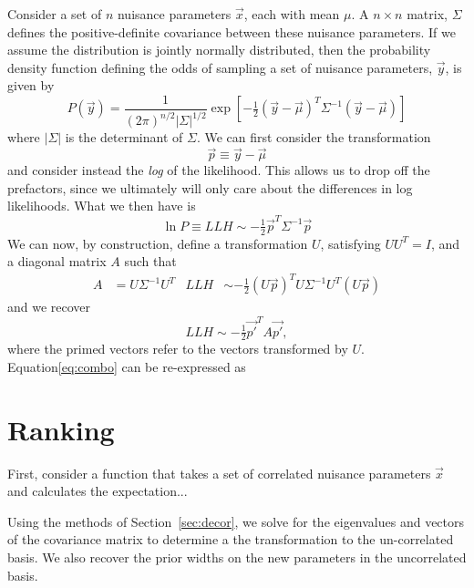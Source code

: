 \documentclass[12pt,a4paper]{article}
\newcommand{\abs}[1]{\left| #1 \right|}
\begin{document}
Consider a set of $n$ nuisance parameters $\vec{x}$, each with mean $\mu$.
A $n\times n$ matrix, $\Sigma$ defines the positive-definite covariance between these nuisance parameters. 
If we assume the distribution is jointly normally distributed, then the probability density function defining the odds of sampling a set of nuisance parameters, $\vec{y}$, is given by
\begin{equation}
    P(\vec{y}) = \dfrac{1}{(2\pi)^{n/2}\abs{\Sigma}^{1/2}}\exp\left[-\tfrac{1}{2}(\vec{y}-\vec{\mu})^{T}\Sigma^{-1}\left(\vec{y}-\vec{\mu}\right)\right]
\end{equation}
where $\abs{\Sigma}$ is the determinant of $\Sigma$. We can first consider the transformation 
\begin{equation}
    \vec{p}\equiv \vec{y}-\vec{\mu}
\end{equation}
and consider instead the \textit{log} of the likelihood.
This allows us to drop off the prefactors, since we ultimately will only care about the differences in log likelihoods.
What we then have is 
\begin{equation}
    \ln P \equiv LLH \sim -\tfrac{1}{2}\vec{p}^{T}\Sigma^{-1}\vec{p}
\end{equation}
We can now, by construction, define a transformation $U$, satisfying $UU^{T}=I$, and a diagonal matrix $A$ such that 
\begin{align}\label{eq:combo}
    A&=U\Sigma^{-1}U^{T} & LLH &\sim -\tfrac{1}{2}(U\vec{p})^{T} U\Sigma^{-1}U^{T}(U \vec{p})
\end{align}
and we recover
\begin{equation}
    LLH \sim -\tfrac{1}{2}\vec{p'}^{T} A\vec{p'},
\end{equation}
where the primed vectors refer to the vectors transformed by $U$. Equation\eqref{eq:combo} can be re-expressed as 

\section{Ranking}

First, consider a function that takes a set of correlated nuisance parameters $\vec{x}$ and calculates the expectation...

Using the methods of Section~\ref{sec:decor}, we solve for the eigenvalues and vectors of the covariance matrix to determine a the transformation to the un-correlated basis. 
We also recover the prior widths on the new parameters in the uncorrelated basis. 

    
\end{document}
